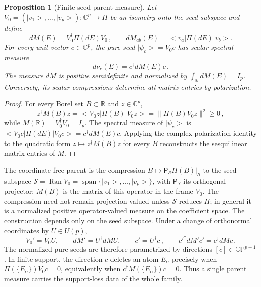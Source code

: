 \documentclass[a4paper,11pt]{article}
\def\ket#1{|#1>}%
\def\bra#1{<#1|}%
\def\dd{d}%
\def\cH{H}%
\newtheorem{proposition}{Proposition}[section]
\theoremstyle{definition}
\theoremstyle{remark}
\newcommand{\ket}[1]{|#1\rangle}
\newcommand{\bra}[1]{\langle #1|}
\newcommand{\dd}{\mathrm d}
\newcommand{\CC}{\mathbb C}
\newcommand{\RR}{\mathbb R}
\newcommand{\cH}{\mathcal H}
\newcommand{\Span}{\operatorname{span}}
\begin{document}
\begin{proposition}[Finite-seed parent measure]
\label{prop:matrix-parent-main}
Let
$V_0=(\ket{v_1},\ldots,\ket{v_p}):\CC^p\to\cH$
be an isometry onto the seed subspace and define
\begin{equation}
   \dd M(E)=V_0^\dagger\Pi(\dd E)V_0\,,
   \qquad
   \dd M_{ab}(E)=\bra{v_a}\Pi(\dd E)\ket{v_b}.
   \label{eq:matrix-measure}
\end{equation}
For every unit vector $c\in\CC^p$, the pure seed
$\ket{\psi_c}=V_0c$ has scalar spectral measure
\begin{equation}
   \dd\nu_c(E)=c^\dagger\dd M(E)c\,.
   \label{eq:scalar-compression}
\end{equation}
The measure $\dd M$ is positive semidefinite and normalized by
$\int_{\RR}\dd M(E)=I_p$.  Conversely, its scalar compressions determine
all matrix entries by polarization.
\end{proposition}

\begin{proof}
For every Borel set $B\subset\RR$ and $z\in\CC^p$,
\begin{equation}
   z^\dagger M(B)z
   =\bra{V_0z}\Pi(B)\ket{V_0z}
   =\|\Pi(B)V_0z\|^2\ge0\,,
\end{equation}
while $M(\RR)=V_0^\dagger V_0=I_p$.  The spectral measure of
$\ket{\psi_c}$ is
$\bra{V_0c}\Pi(\dd E)\ket{V_0c}=c^\dagger\dd M(E)c$.
Applying the complex polarization identity to the quadratic form
$z\mapsto z^\dagger M(B)z$ for every $B$ reconstructs the sesquilinear
matrix entries of $M$.
\end{proof}

The coordinate-free parent is the compression
$B\mapsto\mathsf P_{\mathcal S}\Pi(B)|_{\mathcal S}$
to the seed subspace
$\mathcal S=\operatorname{Ran}V_0=\Span\{\ket{v_1},\ldots,\ket{v_p}\}$, with
$\mathsf P_{\mathcal S}$ its orthogonal projector; $M(B)$ is the matrix of this operator in the
frame $V_0$. The compression need not remain projection-valued unless $\mathcal S$ reduces $H$; in
general it is a normalized positive operator-valued measure on the coefficient space. 
The construction depends only on the seed subspace.  Under a change of
orthonormal coordinates by $U\in U(p)$,
\begin{equation}
   V_0'=V_0U,\qquad
   \dd M'=U^\dagger\dd M U,\qquad
   c'=U^\dagger c\,,\qquad
   c'^\dagger\dd M'c'=c^\dagger\dd M c\,.
   \label{eq:matrix-parent-covariance-main}
\end{equation}
The normalized pure seeds are therefore parametrized by directions
$[c]\in\mathbb{CP}^{p-1}$.
In finite support, the direction $c$ deletes an atom $E_\alpha$ precisely when
$\Pi(\{E_\alpha\})V_0c=0$, equivalently when
$c^\dagger M(\{E_\alpha\})c=0$.  Thus a single parent measure carries the support-loss data of
the whole family.
\end{document}
